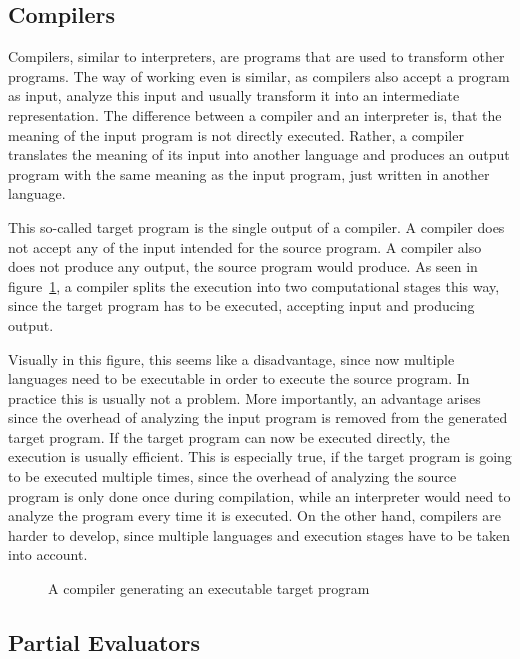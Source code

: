 \subsection{Compilers}

Compilers, similar to interpreters, are programs that are used to transform other programs.
The way of working even is similar, as compilers also accept a program as input, analyze this input and usually transform it into an intermediate representation.
The difference between a compiler and an interpreter is, that the meaning of the input program is not directly executed.
Rather, a compiler translates the meaning of its input into another language and produces an output program with the same meaning as the input program, just written in another language.

This so-called target program is the single output of a compiler.
A compiler does not accept any of the input intended for the source program.
A compiler also does not produce any output, the source program would produce.
As seen in figure~\ref{fig:compiled-program}, a compiler splits the execution into two computational stages this way, since the target program has to be executed, accepting input and producing output.

Visually in this figure, this seems like a disadvantage, since now multiple languages need to be executable in order to execute the source program.
In practice this is usually not a problem.
More importantly, an advantage arises since the overhead of analyzing the input program is removed from the generated target program.
If the target program can now be executed directly, the execution is usually efficient.
This is especially true, if the target program is going to be executed multiple times, since the overhead of analyzing the source program is only done once during compilation, while an interpreter would need to analyze the program every time it is executed.
On the other hand, compilers are harder to develop, since multiple languages and execution stages have to be taken into account.

\begin{figure}
  \centering
  
  \caption{A compiler generating an executable target program}\label{fig:compiled-program}
\end{figure}



\subsection{Partial Evaluators}

